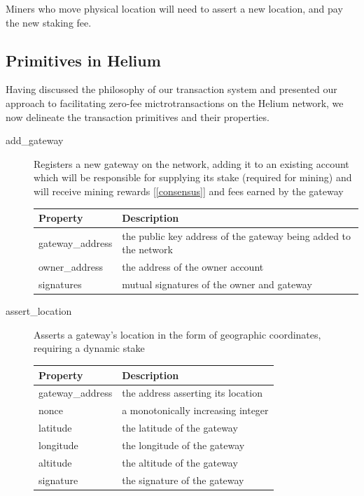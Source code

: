 \documentclass[10pt, nonatbib, nocopyrightspace, reprint]{sigplanconf}
\newcommand{\secref}[1]{[\autoref{#1}]}
\begin{document}
Miners who move physical location will need to assert a new location, and pay the new staking fee.

\subsection{Primitives in Helium} \label{primitives}
Having discussed the philosophy of our transaction system and presented our approach to facilitating zero-fee mictrotransactions on the Helium network, we now delineate the transaction primitives and their properties.

\begin{description}
  \item [add\_gateway] Registers a new gateway on the network, adding it to an existing account which will be responsible for supplying its stake (required for mining) and will receive mining rewards \secref{consensus} and fees earned by the gateway

\begin{table}[H]
  \centering
  \begin{tabularx}{\columnwidth}{l X}
    \toprule
    Property & Description \\ \midrule
    gateway\_address & the public key address of the gateway being added to the network \\
    owner\_address & the address of the owner account \\
    signatures & mutual signatures of the owner and gateway
  \end{tabularx}
\end{table}

\item [assert\_location] Asserts a gateway's location in the form of geographic coordinates, requiring a dynamic stake

\begin{table}[H]
  \centering
  \begin{tabularx}{\columnwidth}{l X}
      \toprule
      Property & Description \\ \midrule
      gateway\_address & the address asserting its location \\
      nonce & a monotonically increasing integer \\
      latitude & the latitude of the gateway \\
      longitude & the longitude of the gateway \\
      altitude & the altitude of the gateway \\
      signature & the signature of the gateway
  \end{tabularx}
\end{table}


\end{description}
\end{document}
